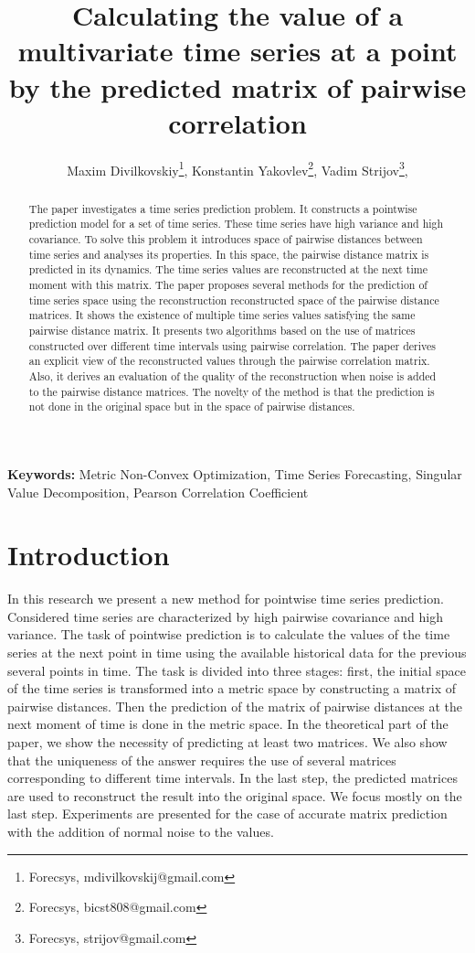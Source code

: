 \documentclass[12pt]{article}
\title{Calculating the value of a multivariate time series at a point by the predicted matrix of pairwise correlation}
\author{%
	Maxim Divilkovskiy\footnote{Forecsys, mdivilkovskij@gmail.com},  %
	Konstantin Yakovlev\footnote{Forecsys,  bicst808@gmail.com},  %
	Vadim Strijov\footnote{Forecsys,  strijov@gmail.com},  %
}
\begin{document}
\maketitle

\begin{abstract}
The paper investigates a time series prediction problem. It constructs a pointwise prediction model for a set of time series. These time series have high variance and high covariance. To solve this problem it introduces space of pairwise distances between time series and analyses its properties. In this space, the pairwise distance matrix is predicted in its dynamics. The time series values are reconstructed at the next time moment with this matrix. The paper proposes several methods for the prediction of time series space using the reconstruction reconstructed space of the pairwise distance matrices. It shows the existence of multiple time series values satisfying the same pairwise distance matrix. It presents two algorithms based on the use of matrices constructed over different time intervals using pairwise correlation. The paper derives an explicit view of the reconstructed values through the pairwise correlation matrix. Also, it derives an evaluation of the quality of the reconstruction when noise is added to the pairwise distance matrices. The novelty of the method is that the prediction is not done in the original space but in the space of pairwise distances.


\end{abstract}

\textbf{Keywords:} Metric Non-Convex Optimization, Time Series Forecasting, Singular Value Decomposition, Pearson Correlation Coefficient

\section{Introduction}
 	In this research we present a new method for pointwise time series prediction. Considered time series are characterized by high pairwise covariance and high variance. The task of pointwise prediction is to calculate the values of the time series at the next point in time using the available historical data for the previous several points in time. The task is divided into three stages: first, the initial space of the time series is transformed into a metric space by constructing a matrix of pairwise distances. Then the prediction of the matrix of pairwise distances at the next moment of time is done in the metric space. In the theoretical part of the paper, we show the necessity of predicting at least two matrices. We also show that the uniqueness of the answer requires the use of several matrices corresponding to different time intervals. In the last step, the predicted matrices are used to reconstruct the result into the original space. We focus mostly on the last step. Experiments are presented for the case of accurate matrix prediction with the addition of normal noise to the values.
\end{document}
